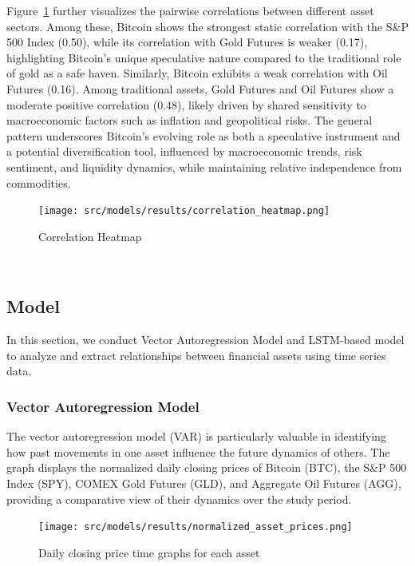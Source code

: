 \documentclass{article}
\begin{document}
Figure~\ref{heat} further visualizes the pairwise correlations between different asset sectors. Among these, Bitcoin shows the strongest static correlation with the S\&P 500 Index (0.50), while its correlation with Gold Futures is weaker (0.17), highlighting Bitcoin’s unique speculative nature compared to the traditional role of gold as a safe haven. Similarly, Bitcoin exhibits a weak correlation with Oil Futures (0.16). Among traditional assets, Gold Futures and Oil Futures show a moderate positive correlation (0.48), likely driven by shared sensitivity to macroeconomic factors such as inflation and geopolitical risks. The general pattern underscores Bitcoin’s evolving role as both a speculative instrument and a potential diversification tool, influenced by macroeconomic trends, risk sentiment, and liquidity dynamics, while maintaining relative independence from commodities.

\begin{figure}[H]
    \centering
    \texttt{[image: src/models/results/correlation\_heatmap.png]}
    \caption{Correlation Heatmap}
    \label{heat}
    
\end{figure}
\

\subsection{Model}

In this section, we conduct Vector Autoregression Model and LSTM-based model to analyze and extract relationships between financial assets using time series data.

\subsubsection{Vector Autoregression Model}

The vector autoregression model (VAR) is particularly valuable in identifying how past movements in one asset influence the future dynamics of others. The graph displays the normalized daily closing prices of Bitcoin (BTC), the S\&P 500 Index (SPY), COMEX Gold Futures (GLD), and Aggregate Oil Futures (AGG), providing a comparative view of their dynamics over the study period.

\begin{figure}[h!]
    \centering
    \texttt{[image: src/models/results/normalized\_asset\_prices.png]}
    \caption{Daily closing price time graphs for each asset}
    \label{prince}
    
\end{figure}
\end{document}
